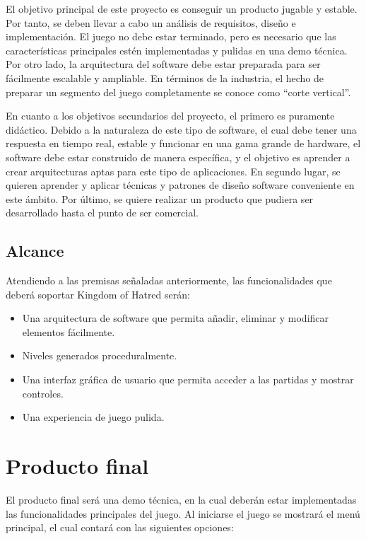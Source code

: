 			El objetivo principal de este proyecto es conseguir un producto jugable y estable. Por tanto, se deben llevar a cabo un análisis de requisitos, diseño e implementación. El juego no debe estar terminado, pero es necesario que las características principales estén implementadas y pulidas en una demo técnica. Por otro lado, la arquitectura del software debe estar preparada para ser fácilmente escalable y ampliable. En términos de la industria, el hecho de preparar un segmento del juego completamente se conoce como ``corte vertical''.

			En cuanto a los objetivos secundarios del proyecto, el primero es puramente didáctico. Debido a la naturaleza de este tipo de software, el cual debe tener una respuesta en tiempo real, estable y funcionar en una gama grande de hardware, el software debe estar construido de manera específica, y el objetivo es aprender a crear arquitecturas aptas para este tipo de aplicaciones. En segundo lugar, se quieren aprender y aplicar técnicas y patrones de diseño software conveniente en este ámbito. Por último, se quiere realizar un producto que pudiera ser desarrollado hasta el punto de ser comercial.

		\subsection{Alcance}
			Atendiendo a las premisas señaladas anteriormente, las funcionalidades que deberá soportar Kingdom of Hatred serán:

			\begin{itemize}
				\item Una arquitectura de software que permita añadir, eliminar y modificar elementos fácilmente.
				
				\item Niveles generados proceduralmente.

				\item Una interfaz gráfica de usuario que permita acceder a las partidas y mostrar controles.

				\item Una experiencia de juego pulida.
			\end{itemize}

	\section{Producto final}

		El producto final será una demo técnica, en la cual deberán estar implementadas las funcionalidades principales del juego. Al iniciarse el juego se mostrará el menú principal, el cual contará con las siguientes opciones:

